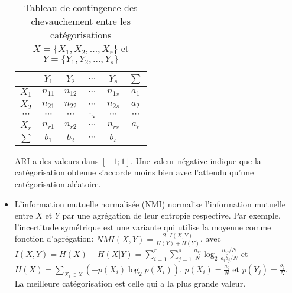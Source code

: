 \begin{itemize}
	\begin{table}[!htb]
		\centering \scriptsize
		\begin{tabular}{|c|c|c|c|c|c|}
			\hline
			& $Y_1$    & $Y_2$    & $\cdots$ & $Y_s$    & $\sum$   \\ \hline
			$X_1$    & $n_{11}$ & $n_{12}$ & $\cdots$ & $n_{1s}$ & $a_1$    \\ \hline
			$X_2$    & $n_{21}$ & $n_{22}$ & $\cdots$ & $n_{2s}$ & $a_2$    \\ \hline
			$\cdots$ & $\cdots$ & $\cdots$ & $\ddots$ & $\cdots$ & $\cdots$ \\ \hline
			$X_r$    & $n_{r1}$ & $n_{r2}$ & $\cdots$ & $n_{rs}$ & $a_r$    \\ \hline
			$\sum$   & $b_1$    & $b_2$    & $\cdots$ & $b_s$    &          \\ \hline
		\end{tabular}
		\caption{Tableau de contingence des chevauchement entre les catégorisations $X = \lbrace X_1, X_2, ..., X_r \rbrace$ et $Y = \lbrace Y_1, Y_2, ..., Y_s \rbrace$}  \label{tab:similarite:tab-contingence}
	\end{table}
ARI a des valeurs dans $[-1;1]$. Une valeur négative indique que la catégorisation obtenue s'accorde moins bien avec l'attendu qu'une catégorisation aléatoire. 
	\item L'information mutuelle normalisée (NMI) \citep{kvalseth1987entropy_NMI,strehl2000nmi, vinh2010clusteringComparison} normalise l'information mutuelle entre $X$ et $Y$ par une agrégation de leur entropie respective. Par exemple, l'incertitude symétrique \citep{kvalseth1987entropy_NMI} est une variante qui utilise la moyenne comme fonction d'agrégation:  $NMI(X,Y) = \frac{2 \cdot I(X,Y)}{H(Y) + H(Y)} $, 
	avec $I(X,Y) = H(X) - H(X \vert Y) = \sum\limits_{i=1}^{r}\sum\limits_{j=1}^{s} \frac{n_{ij}}{N} \log_2\frac{{n_{ij}}/{N}}{{a_ib_j}/{N}}$ et $H(X) = \sum\limits_{X_i \in X}\left(- p(X_i)\log_2 p(X_i)\right)$,  $p(X_i) = \frac{a_i}{N}$ et $p(Y_j) = \frac{b_j}{N}$. La meilleure catégorisation est celle qui a la plus grande valeur.
	

\end{itemize}
